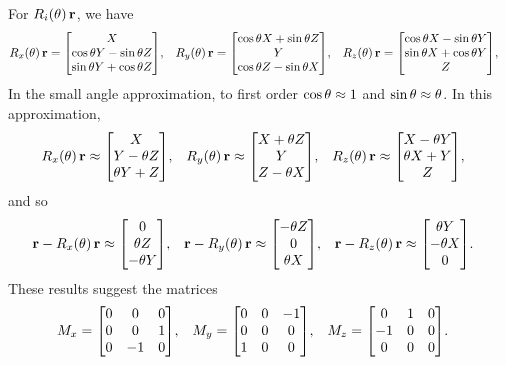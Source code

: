\begin{solution}
	For $R_i(\theta) \, \mathbf{r}$, we have
	\begin{align*}
		\Rxt \, \vr &= \mqty[ X \\ \cost Y - \sint Z \\ \sint Y + \cost Z ], &
		\Ryt \, \vr &= \mqty[ \cost X + \sint Z \\ Y \\ \cost Z - \sint X ], &
		\Rzt \, \vr &= \mqty[ \cost X - \sint Y \\ \sint X + \cost Y \\ Z ],
	\end{align*}
	In the small angle approximation, to first order $\cos{\theta} \approx 1$ and $\sin{\theta} \approx \theta$.  In this approximation,
	\begin{align*}
		\Rxt \, \vr &\approx \mqty[ X \\ Y - \theta Z \\ \theta Y + Z ], &
		\Ryt \, \vr &\approx \mqty[ X + \theta Z \\ Y \\ Z - \theta X ], &
		\Rzt \, \vr &\approx \mqty[ X - \theta Y \\ \theta X + Y \\ Z ],
	\end{align*}
	and so
	\begin{align*}
		\vr - \Rxt \, \vr &\approx \mqty[ 0 \\ \theta Z \\ -\theta Y ], &
		\vr - \Ryt \, \vr &\approx \mqty[ -\theta Z \\ 0 \\ \theta X ], &
		\vr - \Rzt \, \vr &\approx \mqty[ \theta Y \\ -\theta X \\ 0 ].
	\end{align*}
	These results suggest the matrices
	\begin{align*}
		\Mx &= \mqty[ 0 & 0 & 0 \\ 0 & 0 & 1 \\ 0 & -1 & 0 ], &
		\My &= \mqty[ 0 & 0 & -1 \\ 0 & 0 & 0 \\ 1 & 0 & 0 ], &
		\Mz &= \mqty[ 0 & 1 & 0 \\ -1 & 0 & 0 \\ 0 & 0 & 0 ].
	\end{align*}
\end{solution}

\newcommand{\klm}{\ket{l, m}}

